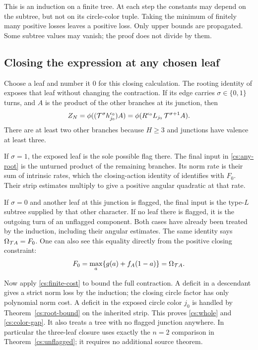 This is an induction on a finite tree. At each step the constants may
depend on the subtree, but not on its circle-color tuple. Taking
the minimum of finitely many positive losses leaves a positive loss.
Only upper bounds are propagated. Some subtree values may vanish;
the proof does not divide by them.

\subsection{Closing the expression at any chosen leaf}

Choose a leaf and number it $0$ for this closing calculation. The
rooting identity of \cite{Newton} exposes that leaf without changing
the contraction. If its
edge carries $\sigma\in\{0,1\}$ turns, and \(A\) is the product of
the other branches at its junction, then
\begin{equation}\label{cs:any-root}
 Z_N=\phi((\mathcal T^\sigma h_{j_0}^{\epsilon_0})A)
     =\phi(R^{\epsilon_0}L_{j_0}\,\mathcal T^{\sigma+1}A).
\end{equation}
There are at least two other branches because \(H\ge3\) and
junctions have valence at least three.

If \(\sigma=1\), the exposed leaf is the sole possible flag there.
The final input in \eqref{cs:any-root} is the unturned product of
the remaining branches. Its norm rate is their sum of intrinsic
rates, which the closing-action identity of \cite[Corollary 7.5]{Newton} identifies
with \(F_0\). Their strip estimates multiply to give a positive
angular quadratic at that rate.

If \(\sigma=0\) and another leaf at this junction is flagged, the
final input is the type-\(L\) subtree supplied by that other
character. If no leaf there is flagged, it is the outgoing turn
of an unflagged component. Both cases have already been treated
by the induction, including their angular estimates. The same
identity says \(\Omega_{\mathcal T A}=F_0\). One can also
see this equality directly from the positive closing constraint:
\[
 F_0=\max_a\{g(a)+f_A(1-a)\}=\Omega_{\mathcal T A}.
\]

Now apply \eqref{cs:finite-cost} to bound the full contraction.
A deficit in a descendant gives a strict norm loss by the induction;
the closing circle factor has only polynomial norm cost. A deficit in
the exposed circle color \(j_0\) is handled by
Theorem~\ref{cs:root-bound} on the inherited strip. This proves
\eqref{cs:whole} and \eqref{cs:color-gap}. It also treats a tree with no
flagged junction anywhere. In particular the three-leaf closure
uses exactly the \(n=2\) comparison in
Theorem~\ref{cs:unflagged}; it requires no additional source theorem.

